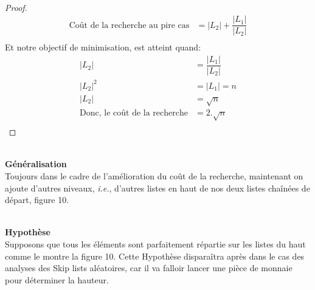 \documentclass[hidelinks,a4paper,12pt]{article}
\begin{document}
~\\

\hypertarget{depart4}{\hyperlink{Coût de recherche}{}}
\begin{proof}
\begin{equation}		
	\begin{aligned}
		\text{Coût de la recherche au pire cas} & =  |L_2| + \dfrac{|L_1|}{|L_2|} \nonumber \\	
	\end{aligned}	
\end{equation}
Et notre objectif de minimisation, est atteint quand:
\begin{equation}		
	\begin{aligned}
		|L_2| & = \dfrac{|L_1|}{|L_2|}\nonumber \\
		|L_2|^2 & = |L_1| = n \nonumber \\		
		|L_2| & = \sqrt{n} \nonumber \\
		\text{Donc, le coût de la recherche} & =  2.\sqrt{n} \nonumber \\	
	\end{aligned}	
\end{equation}
\end{proof}


~\\
 
\textbf {Généralisation} \medskip \\
Toujours dans le cadre de l'amélioration du coût de la recherche, maintenant on ajoute d'autres niveaux, \textit{i.e.}, d'autres listes en haut de nos deux listes chaînées de départ, figure 10.

~\\
 
\textbf {Hypothèse} \medskip \\
 Supposons que tous les éléments sont parfaitement répartie sur les listes du haut comme le montre la figure 10. Cette Hypothèse disparaîtra après dans le cas des analyses des Skip lists aléatoires, car il va falloir lancer une pièce de monnaie pour déterminer la hauteur.


\end{document}

